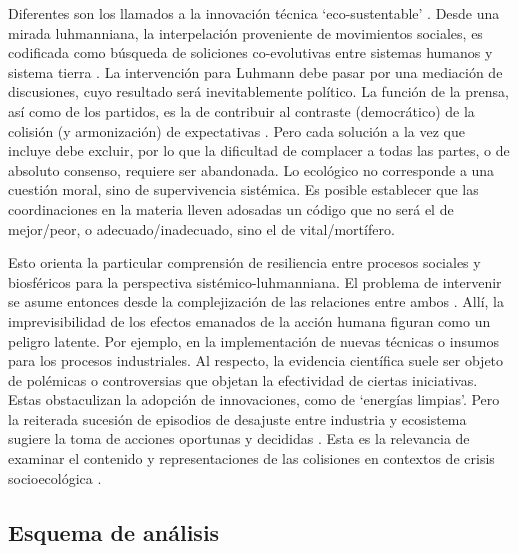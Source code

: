 \documentclass{textolivre}
\begin{document}
Diferentes son los llamados a la innovación técnica ‘eco-sustentable’ \cite{roman2016}. 
Desde una mirada luhmanniana, la interpelación proveniente de movimientos
sociales, es codificada como búsqueda de soliciones co-evolutivas entre sistemas
humanos y sistema tierra \cite{Folke2016,Luhmann2012}. La intervención
para Luhmann debe pasar por una mediación de discusiones, cuyo resultado será
inevitablemente político. La función de la prensa, así como de los partidos, es la de
contribuir al contraste (democrático) de la colisión (y armonización) de expectativas
\cite{Habermas2006,Luhmann2007}. Pero cada solución a la vez que incluye debe
excluir, por lo que la dificultad de complacer a todas las partes, o de absoluto consenso,
requiere ser abandonada. Lo ecológico no corresponde a una cuestión moral, sino de
supervivencia sistémica. Es posible establecer que las coordinaciones en la materia lleven
adosadas un código que no será el de mejor/peor, o adecuado/inadecuado, sino el de
vital/mortífero.

Esto orienta la particular comprensión de resiliencia entre procesos sociales y
biosféricos para la perspectiva sistémico-luhmanniana. El problema de intervenir se
asume entonces desde la complejización de las relaciones entre ambos \cite{billi2017}.
Allí, la imprevisibilidad de los efectos emanados de la acción humana
figuran como un peligro latente. Por ejemplo, en la implementación de nuevas técnicas o
insumos para los procesos industriales. Al respecto, la evidencia científica suele ser objeto
de polémicas o controversias que objetan la efectividad de ciertas iniciativas. Estas
obstaculizan la adopción de innovaciones, como de ‘energías limpias’. Pero la reiterada
sucesión de episodios de desajuste entre industria y ecosistema sugiere la toma de
acciones oportunas y decididas \cite{Mascareo2018}. Esta es la relevancia de examinar
el contenido y representaciones de las colisiones en contextos de crisis socioecológica
\cite{ValdebenitoAllendes2018}.



\subsection{Esquema de análisis}\label{sec-esquemas}
\end{document}
